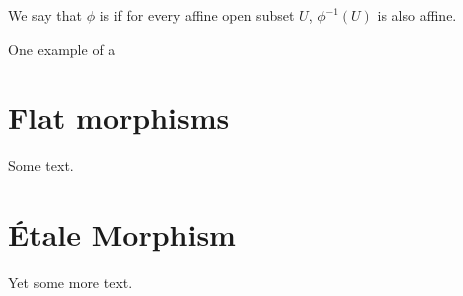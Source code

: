 \begin{defn}
We say that $\phi$ is  if for every 
affine open subset $U$, $\phi^{-1}(U)$ is also affine. 
\end{defn}

One example of a 

\section{Flat morphisms}

Some text.

\section{\'Etale Morphism}

Yet some more text.
